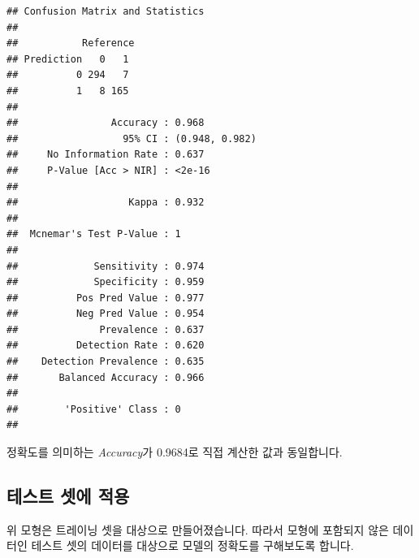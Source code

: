 \documentclass[12pt,]{book}
\newenvironment{Shaded}{\begin{snugshade}}{\end{snugshade}}
\newcommand{\DataTypeTok}[1]{\textcolor[rgb]{0.13,0.29,0.53}{#1}}
\newcommand{\DecValTok}[1]{\textcolor[rgb]{0.00,0.00,0.81}{#1}}
\newcommand{\FloatTok}[1]{\textcolor[rgb]{0.00,0.00,0.81}{#1}}
\newcommand{\KeywordTok}[1]{\textcolor[rgb]{0.13,0.29,0.53}{\textbf{#1}}}
\newcommand{\NormalTok}[1]{#1}
\newcommand{\OperatorTok}[1]{\textcolor[rgb]{0.81,0.36,0.00}{\textbf{#1}}}
\newcommand{\StringTok}[1]{\textcolor[rgb]{0.31,0.60,0.02}{#1}}
\begin{document}
\begin{verbatim}
## Confusion Matrix and Statistics
## 
##           Reference
## Prediction   0   1
##          0 294   7
##          1   8 165
##                                         
##                Accuracy : 0.968         
##                  95% CI : (0.948, 0.982)
##     No Information Rate : 0.637         
##     P-Value [Acc > NIR] : <2e-16        
##                                         
##                   Kappa : 0.932         
##                                         
##  Mcnemar's Test P-Value : 1             
##                                         
##             Sensitivity : 0.974         
##             Specificity : 0.959         
##          Pos Pred Value : 0.977         
##          Neg Pred Value : 0.954         
##              Prevalence : 0.637         
##          Detection Rate : 0.620         
##    Detection Prevalence : 0.635         
##       Balanced Accuracy : 0.966         
##                                         
##        'Positive' Class : 0             
## 
\end{verbatim}

정확도를 의미하는 \emph{Accuracy}가 0.9684로 직접 계산한 값과 동일합니다.

\hypertarget{uxd14cuxc2a4uxd2b8-uxc14buxc5d0-uxc801uxc6a9}{%
\subsection{테스트 셋에 적용}\label{uxd14cuxc2a4uxd2b8-uxc14buxc5d0-uxc801uxc6a9}}

위 모형은 트레이닝 셋을 대상으로 만들어졌습니다. 따라서 모형에 포함되지 않은 데이터인 테스트 셋의 데이터를 대상으로 모델의 정확도를 구해보도록 합니다.

\begin{Shaded}
\end{Shaded}
\end{document}
